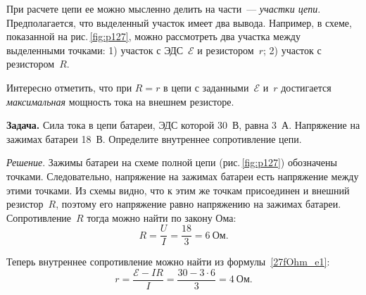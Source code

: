 \documentclass[main.tex]{subfiles}
\begin{document}
При расчете цепи ее можно мысленно делить на части~--- \emph{участки цепи}. Предполагается, что выделенный участок имеет два вывода. Например, в схеме, показанной на рис.\,\ref{fig:p127}, можно рассмотреть два участка между выделенными точками: 1) участок с ЭДС~$\mathscr E$ и резистором~$r$; 2) участок с резистором~$R$. 



Интересно отметить, что при $R=r$ в цепи с заданными~$\mathscr E$ и~$r$ достигается \emph{максимальная} мощность тока на внешнем резисторе.

\medskip

\noindent\textbf{Задача.} Сила тока в цепи батареи, ЭДС которой 30~В, равна 3~А. Напряжение на зажимах батареи 18~В. Определите внутреннее сопротивление цепи.

\smallskip

\noindent\emph{Решение}. Зажимы батареи на схеме полной цепи (рис.\,\ref{fig:p127}) обозначены точками. Следовательно, напряжение на зажимах батареи есть напряжение между этими точками. Из схемы видно, что к этим же точкам присоединен и внешний резистор~$R$, поэтому его напряжение равно напряжению на зажимах батареи. Сопротивление~$R$ тогда можно найти по закону Ома: 
\begin{equation*}
    R=\frac{U}{I}=\frac{18}{3}=6~\text{Ом.}
\end{equation*}

Теперь внутреннее сопротивление можно найти из формулы~\eqref{27fOhm_e1}:
\begin{equation*}
    r=\frac{\mathscr E-IR}{I}=\frac{30-3\cdot6}{3}=4~\text{Ом}.
\end{equation*}









 
\end{document}
